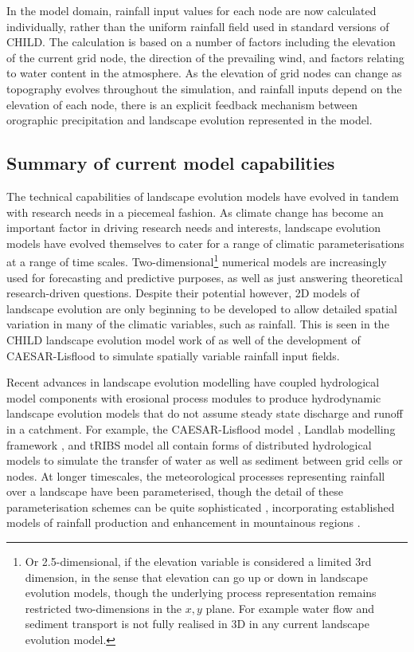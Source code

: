 In the model domain, rainfall input values for each node are now calculated individually, rather than the uniform rainfall field used in standard versions of CHILD. The calculation is based on a number of factors including the elevation of the current grid node, the direction of the prevailing wind, and factors relating to water content in the atmosphere. As the elevation of grid nodes can change as topography evolves throughout the simulation, and rainfall inputs depend on the elevation of each node, there is an explicit feedback mechanism between orographic precipitation and landscape evolution represented in the model. 

\subsection{Summary of current model capabilities}

The technical capabilities of landscape evolution models have evolved in tandem with research needs in a piecemeal fashion. As climate change has become an important factor in driving research needs and interests, landscape evolution models have evolved themselves to cater for a range of climatic parameterisations at a range of time scales. Two-dimensional\footnote{Or 2.5-dimensional, if the elevation variable is considered a limited 3rd dimension, in the sense that elevation can go up or down in landscape evolution models, though the underlying process representation remains restricted two-dimensions in the \(x,y\) plane. For example water flow and sediment transport is not fully realised in 3D in any current landscape evolution model.} numerical models are increasingly used for forecasting and predictive purposes, as well as just answering theoretical research-driven questions. Despite their potential however, 2D models of landscape evolution are only beginning to be developed to allow detailed spatial variation in many of the climatic variables, such as rainfall. This is seen in the CHILD landscape evolution model work of \citet{han2015measuring} as well of the development of CAESAR-Lisflood \citep{coulthard2016sensitivity,coulthard2017caesarlisflood} to simulate spatially variable rainfall input fields. 

Recent advances in landscape evolution modelling have coupled hydrological model components with erosional process modules to produce hydrodynamic landscape evolution models that do not assume steady state discharge and runoff in a catchment. For example, the CAESAR-Lisflood model \citep{Coulthard2013}, Landlab modelling framework \citep{hobley2017creative}, and tRIBS model \citep{vivoni2011real} all contain forms of distributed hydrological models to simulate the transfer of water as well as sediment between grid cells or nodes. At longer timescales, the meteorological processes representing rainfall over a landscape have been parameterised, though the detail of these parameterisation schemes can be quite sophisticated \citep[e.g.][]{han2015measuring}, incorporating established models of rainfall production and enhancement in mountainous regions \citep{Roe2002,Roe2003,smith2004linear}.

